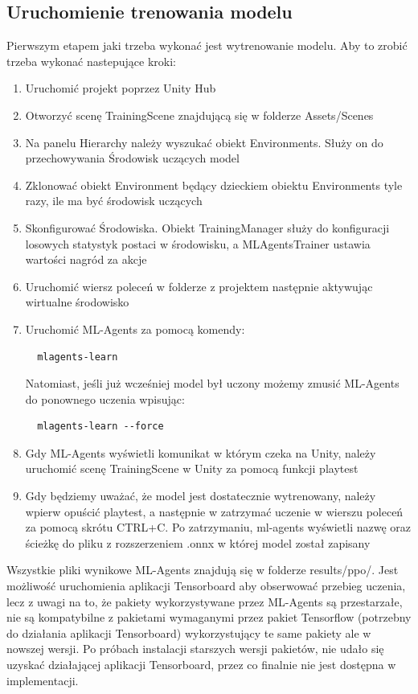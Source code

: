 \documentclass{SGGW-thesis}
\begin{document}
\subsection{Uruchomienie trenowania modelu}
Pierwszym etapem jaki trzeba wykonać jest wytrenowanie modelu. Aby to zrobić trzeba wykonać nastepujące kroki:
\begin{enumerate}
  \item{Uruchomić projekt poprzez Unity Hub}
  \item{Otworzyć scenę TrainingScene znajdującą się w folderze Assets/Scenes}
  \item{Na panelu Hierarchy należy wyszukać obiekt Environments. Służy on do przechowywania Środowisk uczących model}
  \item{Zklonować obiekt Environment będący dzieckiem obiektu Environments tyle razy, ile ma być środowisk uczących}
  \item{Skonfigurować Środowiska. Obiekt TrainingManager służy do konfiguracji losowych statystyk postaci w środowisku, a MLAgentsTrainer ustawia wartości nagród za akcje}
  \item{Uruchomić wiersz poleceń w folderze z projektem następnie aktywując wirtualne środowisko}
  \item{Uruchomić ML-Agents za pomocą komendy:
  \begin{lstlisting}
  mlagents-learn
  \end{lstlisting}
  Natomiast, jeśli już wcześniej model był uczony możemy zmusić ML-Agents do ponownego uczenia wpisując:
  \begin{lstlisting}
  mlagents-learn --force
  \end{lstlisting}}
  \item{Gdy ML-Agents wyświetli komunikat w którym czeka na Unity, należy uruchomić scenę TrainingScene w Unity za pomocą funkcji playtest}
  \item{Gdy będziemy uważać, że model jest dostatecznie wytrenowany, należy wpierw opuścić playtest, a następnie w zatrzymać uczenie w wierszu poleceń za pomocą skrótu CTRL+C.
  Po zatrzymaniu, ml-agents wyświetli nazwę oraz ścieżkę do pliku z rozszerzeniem .onnx w której model został zapisany}
\end{enumerate}
Wszystkie pliki wynikowe ML-Agents znajdują się w folderze results/ppo/. Jest możliwość uruchomienia aplikacji Tensorboard aby obserwować przebieg uczenia, lecz z uwagi na to, 
że pakiety wykorzystywane przez ML-Agents są przestarzałe, nie są kompatybilne z pakietami wymaganymi przez pakiet Tensorflow (potrzebny do działania aplikacji Tensorboard) wykorzystujący te same pakiety ale w nowszej wersji.
Po próbach instalacji starszych wersji pakietów, nie udało się uzyskać działającej aplikacji Tensorboard, przez co finalnie nie jest dostępna w implementacji.
\end{document}
